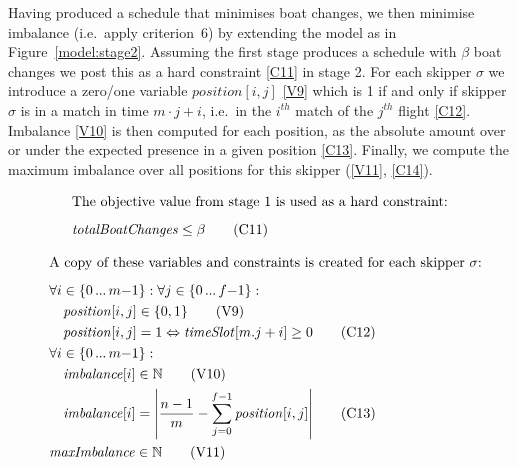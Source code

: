 \documentclass{llncs}
\newcommand{\timeSlot}{\mathit{timeSlot}}
\newcommand{\totalBoatChanges}{\mathit{totalBoatChanges}}
\newcommand{\position}{\mathit{position}}
\newcommand{\imbalance}{\mathit{imbalance}}
\newcommand{\maxImbalance}{\mathit{maxImbalance}}
\DeclarePairedDelimiter\abs{\lvert}{\rvert}
\newcommand\nldots{\,\hbox to 0.8em{.\hss.\hss.}\,}
\begin{document}
Having produced a schedule that minimises boat changes, we then minimise imbalance (i.e.\ apply
criterion~6) by extending the model as in Figure~\ref{model:stage2}.  Assuming the first stage
produces a schedule with $\beta$ boat changes we post this as a hard constraint \eqref{C11} in stage
2. For each skipper $\sigma$ we introduce a zero/one variable $position[{i,j}]$ \eqref{V9} which is
1 if and only if skipper $\sigma$ is in a match in time $m \cdot j + i$, i.e.\ in the $i^{th}$ match
of the  $j^{th}$ flight \eqref{C12}. Imbalance \eqref{V10} is then computed for each position, as
the absolute amount over or under the expected presence in a given position \eqref{C13}. Finally, we
compute the maximum imbalance over all positions for this skipper (\ref{V11}, \ref{C14}).

\begin{figure}[tb]
\setlength{\mathindent}{1em}
\setlength{\abovedisplayskip}{0pt}
\setlength{\belowdisplayskip}{0pt}
\setlength{\abovecaptionskip}{0pt}
\begin{framed}
\begin{align}
    \intertext{The objective value from stage 1 is used as a hard constraint:\smallskip}
    & \totalBoatChanges \leq \beta \tag{C11} \label{C11}
\end{align}
\end{framed}\begin{framed}
\begin{align}
    \intertext{A copy of these variables and constraints is created for each skipper $\sigma$:\smallskip}
    & \forall i \in \{ 0 \nldots m{-}1 \} : \forall j \in \{ 0 \nldots f{-}1 \} : \nonumber \\
    & \hspace*{1em} \position[{i,j}] \in \{0,1\} \tag{V9} \label{V9} \\
    & \hspace*{1em} \position[{i,j}] = 1 \Leftrightarrow \timeSlot[{m.j+i}] \geq 0 \tag{C12} \label{C12} \\
    & \forall i \in \{ 0 \nldots m{-}1 \} : \nonumber \\
    & \hspace*{1em} \imbalance[{i}] \in \mathbb{N} \label{V10} \tag{V10} \\
    & \hspace*{1em} \imbalance[{i}] = \abs*{\frac{n-1}{m} - \sum_{j=0}^{f-1} \position[{i,j}]} \label{C13} \tag{C13} \\
    & \maxImbalance \in \mathbb{N} \label{V11} \tag{V11} \\

\end{align}
\end{framed}
\end{figure}
\end{document}
